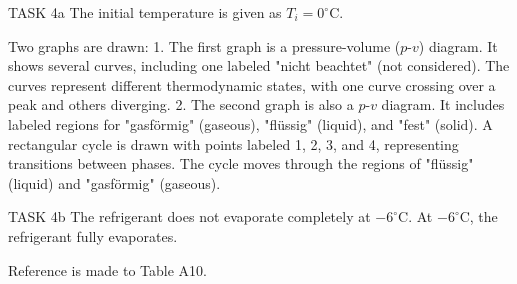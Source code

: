 TASK 4a  
The initial temperature is given as \( T_i = 0^\circ\text{C} \).  

Two graphs are drawn:  
1. The first graph is a pressure-volume (\( p \)-\( v \)) diagram. It shows several curves, including one labeled "nicht beachtet" (not considered). The curves represent different thermodynamic states, with one curve crossing over a peak and others diverging.  
2. The second graph is also a \( p \)-\( v \) diagram. It includes labeled regions for "gasförmig" (gaseous), "flüssig" (liquid), and "fest" (solid). A rectangular cycle is drawn with points labeled 1, 2, 3, and 4, representing transitions between phases. The cycle moves through the regions of "flüssig" (liquid) and "gasförmig" (gaseous).  

TASK 4b  
The refrigerant does not evaporate completely at \(-6^\circ\text{C}\).  
At \(-6^\circ\text{C}\), the refrigerant fully evaporates.  

Reference is made to Table A10.